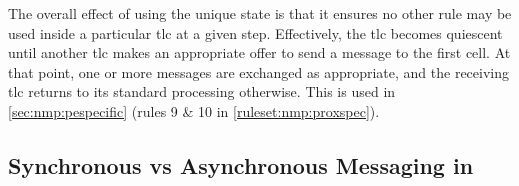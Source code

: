 The overall effect of using the unique state is that it ensures no other rule may be used inside a particular \gls{tlc} at a given step.  Effectively, the \gls{tlc} becomes quiescent until another \gls{tlc} makes an appropriate offer to send a message to the first cell.  At that point, one or more messages are exchanged as appropriate, and the receiving \gls{tlc} returns to its standard processing otherwise.  This is used in \cref{sec:nmp:pespecific} (rules 9 \& 10 in \vref{ruleset:nmp:proxspec}).


\subsection{\label{sec:cps:syncasync}Synchronous vs Asynchronous Messaging in }


